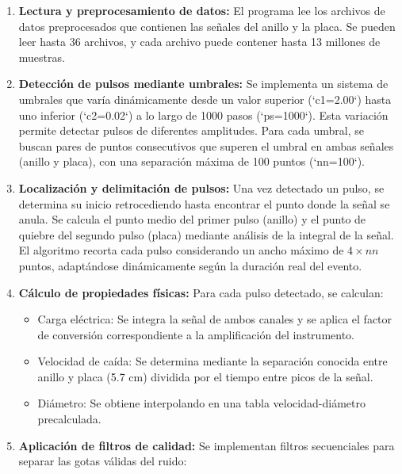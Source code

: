 \documentclass[12pt,a4paper]{article}
\begin{document}
\begin{enumerate}

\item \textbf{Lectura y preprocesamiento de datos:} El programa lee los archivos de datos
preprocesados que contienen las señales del anillo y la placa. Se pueden leer hasta
36 archivos, y cada archivo puede contener hasta 13 millones de muestras.

\item \textbf{Detección de pulsos mediante umbrales:} Se implementa un sistema de umbrales que varía dinámicamente desde un valor superior (`c1=2.00`) hasta
uno inferior (`c2=0.02`) a lo largo de 1000 pasos (`ps=1000`). Esta variación permite
detectar pulsos de diferentes amplitudes.
Para cada umbral, se buscan pares de puntos consecutivos que superen el umbral en ambas señales (anillo y placa), con una separación máxima de 100 puntos
(`nn=100`).

\item \textbf{Localización y delimitación de pulsos:} Una vez detectado un pulso, se determina su inicio retrocediendo hasta encontrar el punto donde la señal se anula. Se
calcula el punto medio del primer pulso (anillo) y el punto de quiebre del segundo
pulso (placa) mediante análisis de la integral de la señal.
El algoritmo recorta cada pulso considerando un ancho máximo de $4\times nn$ puntos,
adaptándose dinámicamente según la duración real del evento.

\item \textbf{Cálculo de propiedades físicas:} Para cada pulso detectado, se calculan:

\begin{itemize}
    \item Carga eléctrica: Se integra la señal de ambos canales y se aplica el factor de
    conversión correspondiente a la amplificación del instrumento.
    \item Velocidad de caída: Se determina mediante la separación conocida entre
    anillo y placa (5.7 cm) dividida por el tiempo entre picos de la señal.
    \item Diámetro: Se obtiene interpolando en una tabla velocidad-diámetro precalculada.
\end{itemize}

\item \textbf{Aplicación de filtros de calidad:} Se implementan filtros secuenciales para separar
las gotas válidas del ruido:

\begin{itemize}


\end{itemize}
\end{enumerate}
\end{document}
